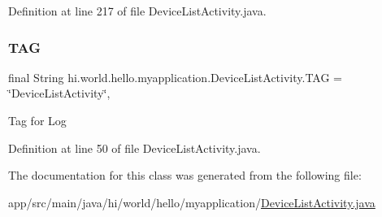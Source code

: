 Definition at line 217 of file Device\+List\+Activity.\+java.

\mbox{\label{classhi_1_1world_1_1hello_1_1myapplication_1_1_device_list_activity_a54fe4b51cb417f2ceac0f57b1e21d991}} 
\subsubsection{\texorpdfstring{TAG}{TAG}}
{\footnotesize\ttfamily final String hi.\+world.\+hello.\+myapplication.\+Device\+List\+Activity.\+T\+AG = \char`\"{}Device\+List\+Activity\char`\"{}\hspace{0.3cm}{\ttfamily [static]}, {\ttfamily [private]}}

Tag for Log 

Definition at line 50 of file Device\+List\+Activity.\+java.



The documentation for this class was generated from the following file\+:\begin{DoxyCompactItemize}
\item 
app/src/main/java/hi/world/hello/myapplication/\mbox{\hyperlink{_device_list_activity_8java}{Device\+List\+Activity.\+java}}\end{DoxyCompactItemize}
